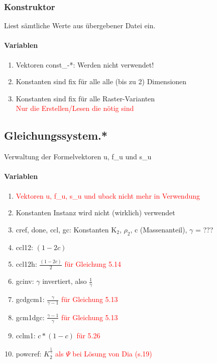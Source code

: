 \documentclass[12pt]{article}
\begin{document}
\subsubsection{Konstruktor}
Liest sämtliche Werte aus übergebener Datei ein.

\renewcommand{\labelenumi}{\alph{enumi})} 
\paragraph{Variablen}
\begin{enumerate}
	\item Vektoren const\_-*: Werden nicht verwendet!
	\item Konstanten sind fix für alle alle (bis zu 2) Dimensionen
	\item Konstanten sind fix für alle Raster-Varianten\\
	\textcolor{red}{Nur die Erstellen/Lesen die nötig sind}
\end{enumerate}

\subsection{Gleichungssystem.*}
Verwaltung der Formelvektoren u, f\_u und s\_u

\renewcommand{\labelenumi}{\alph{enumi})} 
\paragraph{Variablen}
\begin{enumerate}
	\item \textcolor{red}{Vektoren u, f\_u, s\_u und uback nicht mehr in Verwendung}
	\item Konstanten Instanz wird nicht (wirklich) verwendet
	\item cref, done, ccl, gc: Konstanten K$_2$, $\rho _2$, c (Massenanteil), $\gamma$ = ???\\
	\item ccl12: $(1-2c)$ 
	\item ccl12h: $\frac{(1-2c)}{2}$ \textcolor{red}{für Gleichung 5.14}
	\item gcinv: $\gamma$ invertiert, also $\frac{1}{\gamma}$
	\item gcdgcm1: $\frac{\gamma}{\gamma - 1}$ \textcolor{red}{für Gleichung 5.13}
	\item gcm1dgc: $\frac{\gamma - 1}{\gamma}$ \textcolor{red}{für Gleichung 5.13}
	\item cclm1: $c*(1-c)$ \textcolor{red}{für 5.26}
	\item powcref: $K_2^{\frac{1}{\gamma}}$ \textcolor{red}{als $\Psi$ bei Lösung von Dia (s.19)}
\end{enumerate}
\end{document}
